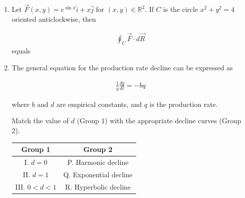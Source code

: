 \documentclass[journal,12pt,onecolumn]{IEEEtran}
\theoremstyle{remark}
\begin{document}
\begin{enumerate}
\hfill{}

\begin{enumerate}
\end{enumerate}

\item Let $\vec{F}(x,y) = e^{\sin x} \hat{i} + x \hat{j}$ for $(x, y) \in \mathbb{R}^2$. If $C$ is the circle $x^2 + y^2 = 4$ oriented anticlockwise, then

\begin{align*}
\oint_C \vec{F} \cdot d\vec{R}
\end{align*}
equals

\hfill{}

\begin{enumerate}
\end{enumerate}

\pagebreak

\item The general equation for the production rate decline can be expressed as

\begin{align*}
\frac{1}{q} \frac{dq}{dt} = -b q
\end{align*}

where $b$ and $d$ are empirical constants, and $q$ is the production rate.  

Match the value of $d$ (Group 1) with the appropriate decline curves (Group 2).  

\begin{tabular}{|c|c|}
\hline
\textbf{Group 1} & \textbf{Group 2} \\
\hline
I. $d = 0$ & P. Harmonic decline \\
II. $d = 1$ & Q. Exponential decline \\
III. $0 < d < 1$ & R. Hyperbolic decline \\
\hline
\end{tabular}


\end{enumerate}
\end{document}
